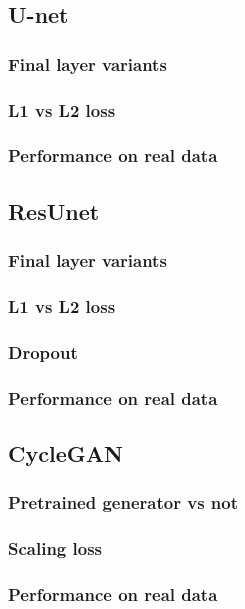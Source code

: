 \subsection{U-net}
\subsubsection{Final layer variants}
\subsubsection{L1 vs L2 loss}
\subsubsection{Performance on real data}

\subsection{ResUnet}
\subsubsection{Final layer variants}
\subsubsection{L1 vs L2 loss}
\subsubsection{Dropout}
\subsubsection{Performance on real data}

\subsection{CycleGAN}
\subsubsection{Pretrained generator vs not}
\subsubsection{Scaling loss}
\subsubsection{Performance on real data}

